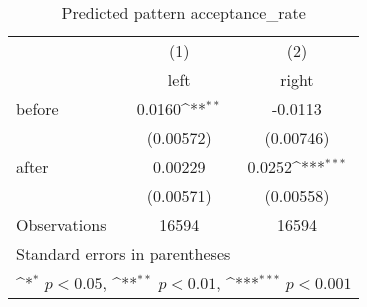\begin{table}[htbp]\centering
\def\sym#1{\ifmmode^{#1}\else\(^{#1}\)\fi}
\caption{Predicted pattern acceptance\_rate}
\begin{tabular}{l*{2}{c}}
\hline\hline
                    &\multicolumn{1}{c}{(1)}&\multicolumn{1}{c}{(2)}\\
                    &\multicolumn{1}{c}{left}&\multicolumn{1}{c}{right}\\
\hline
before              &      0.0160\sym{**} &     -0.0113         \\
                    &   (0.00572)         &   (0.00746)         \\
[1em]
after               &     0.00229         &      0.0252\sym{***}\\
                    &   (0.00571)         &   (0.00558)         \\
\hline
Observations        &       16594         &       16594         \\
\hline\hline
\multicolumn{3}{l}{\footnotesize Standard errors in parentheses}\\
\multicolumn{3}{l}{\footnotesize \sym{*} \(p<0.05\), \sym{**} \(p<0.01\), \sym{***} \(p<0.001\)}\\
\end{tabular}
\end{table}
